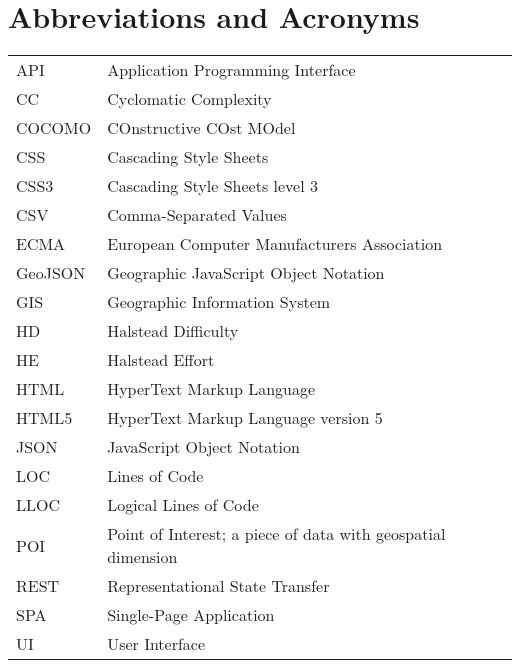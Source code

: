 
\chapter*{Abbreviations and Acronyms}


\noindent
\begin{longtable}{@{}p{}p{}@{}}
API & Application Programming Interface \\
CC & Cyclomatic Complexity \\
COCOMO & COnstructive COst MOdel \\
CSS & Cascading Style Sheets \\
CSS3 & Cascading Style Sheets level 3 \\
CSV & Comma-Separated Values \\
ECMA & European Computer Manufacturers Association \\
GeoJSON & Geographic JavaScript Object Notation \\
GIS & Geographic Information System \\
HD & Halstead Difficulty \\
HE & Halstead Effort \\
HTML & HyperText Markup Language \\
HTML5 & HyperText Markup Language version 5 \\
JSON & JavaScript Object Notation \\
LOC & Lines of Code \\
LLOC & Logical Lines of Code \\
POI & Point of Interest; a piece of data with geospatial dimension \\
REST & Representational State Transfer \\
SPA & Single-Page Application \\
UI & User Interface \\

\end{longtable}
